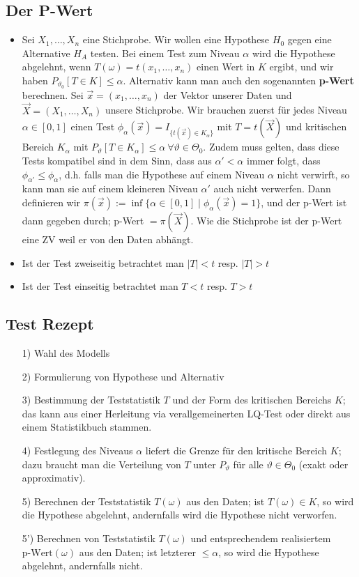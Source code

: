 \subsection{Der P-Wert}
\begin{itemize}
    \item Sei $X_1, \dots, X_n$ eine Stichprobe. Wir wollen eine Hypothese $H_0$ gegen eine Alternative $H_A$ testen. Bei einem Test zum Niveau $\alpha$ wird die Hypothese abgelehnt, wenn $T(\omega) = t(x_1, \dots, x_n)$ einen Wert in $K$ ergibt, und wir haben $P_{\vartheta_0} [T \in K] \le \alpha$. Alternativ kann man auch den sogenannten \textbf{p-Wert} berechnen. Sei $\overrightarrow{x} = (x_1, \dots, x_n)$ der Vektor unserer Daten und $\overrightarrow{X} = (X_1, \dots, X_n)$ unsere Stichprobe. Wir brauchen zuerst für jedes Niveau $\alpha \in [0, 1]$ einen Test $\phi_\alpha(\overrightarrow{x}) = I_{\{t(\overrightarrow{x}) \in K_\alpha\} }$ mit $T = t(\overrightarrow{X})$ und kritischen Bereich $K_\alpha$ mit $P_\vartheta[T \in K_\alpha] \le \alpha \ \forall \vartheta \in \Theta_0$. Zudem muss gelten, dass diese Tests kompatibel sind in dem Sinn, dass aus $\alpha' < \alpha$ immer folgt, dass $\phi_{\alpha'} \le \phi_\alpha$, d.h. falls man die Hypothese auf einem Niveau $\alpha$ nicht verwirft, so kann man sie auf einem kleineren Niveau $\alpha'$ auch nicht verwerfen. Dann definieren wir $\pi(\overrightarrow{x}) := \inf \{\alpha \in [0, 1] \mid \phi_\alpha(\overrightarrow{x}) = 1\}$, und der p-Wert ist dann gegeben durch; p-Wert $= \pi(\overrightarrow{X})$. Wie die Stichprobe ist der p-Wert eine ZV weil er von den Daten abhängt.
    \item Ist der Test zweiseitig betrachtet man $|T| < t$ resp. $|T| > t$
    \item Ist der Test einseitig betrachtet man $T < t$ resp. $T > t$
\end{itemize}

\subsection{Test Rezept}
\begin{itemize}[leftmargin=0.35cm]
    \item[1)] Wahl des Modells
    \item[2)] Formulierung von Hypothese und Alternativ
    \item[3)] Bestimmung der Teststatistik $T$ und der Form des kritischen Bereichs $K$; das kann aus einer Herleitung via verallgemeinerten LQ-Test oder direkt aus einem Statistikbuch stammen.
    \item[4)] Festlegung des Niveaus $\alpha$ liefert die Grenze für den kritische Bereich $K$; dazu braucht man die Verteilung von $T$ unter $P_\vartheta$ für alle $\vartheta \in \Theta_0$ (exakt oder approximativ).
    \item[5)] Berechnen der Teststatistik $T(\omega)$ aus den Daten; ist $T(\omega) \in K$, so wird die Hypothese abgelehnt, andernfalls wird die Hypothese nicht verworfen.
    \item[5')] Berechnen von Teststatistik $T(\omega)$ und entsprechendem realisiertem $\text{p-Wert}(\omega)$ aus den Daten; ist letzterer $\le \alpha$, so wird die Hypothese abgelehnt, andernfalls nicht.
\end{itemize}
